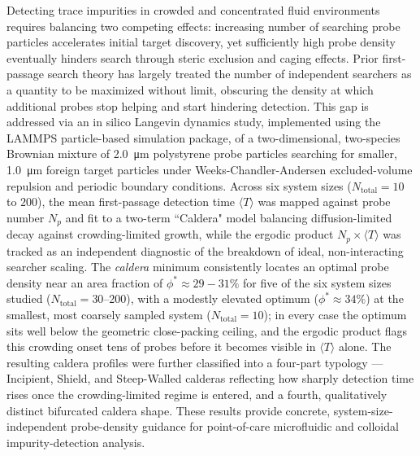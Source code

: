 Detecting trace impurities in crowded and concentrated fluid environments requires balancing two competing effects: increasing number of searching probe particles accelerates initial target discovery, yet sufficiently high probe density eventually hinders search through steric exclusion and caging effects. Prior first-passage search theory has largely treated the number of independent searchers as a quantity to be maximized without limit, obscuring the density at which additional probes stop helping and start hindering detection. This gap is addressed via an in silico Langevin dynamics study, implemented using the LAMMPS particle-based simulation package, of a two-dimensional, two-species Brownian mixture of \SI{2.0}{\micro\meter} polystyrene probe particles searching for smaller, \SI{1.0}{\micro\meter} foreign target particles under Weeks-Chandler-Andersen excluded-volume repulsion and periodic boundary conditions. Across six system sizes ($N_\text{total} = 10$ to $200$), the mean first-passage detection time $\langle T \rangle$ was mapped against probe number $N_p$ and fit to a two-term ``Caldera" model balancing diffusion-limited decay against crowding-limited growth, while the ergodic product $N_p \times \langle T \rangle$ was tracked as an independent diagnostic of the breakdown of ideal, non-interacting searcher scaling. The \textit{caldera} minimum consistently locates an optimal probe density near an area fraction of $\phi^*\approx29-31\%$ for five of the six system sizes studied ($N_\text{total} = 30$--200), with a modestly elevated optimum ($\phi^* \approx 34\%$) at the smallest, most coarsely sampled system ($N_\text{total} = 10$); in every case the optimum sits well below the geometric close-packing ceiling, and the ergodic product flags this crowding onset tens of probes before it becomes visible in $\langle T \rangle$ alone. The resulting caldera profiles were further classified into a four-part typology --- Incipient, Shield, and Steep-Walled calderas reflecting how sharply detection time rises once the crowding-limited regime is entered, and a fourth, qualitatively distinct bifurcated caldera shape. These results provide concrete, system-size-independent probe-density guidance for point-of-care microfluidic and colloidal impurity-detection analysis.


